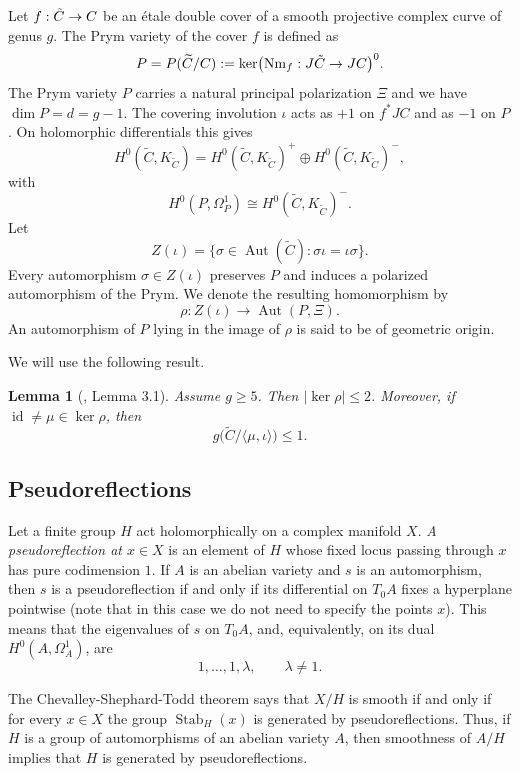 \documentclass{article}
\newtheorem{lem}[thm]{Lemma}
\numberwithin{equation}{section}
\newcommand{\tC}{\Tilde{C}}
\DeclareMathOperator{\Aut}{Aut}
\begin{document}
Let $f:\tC\to C$ be an \'{e}tale double cover of a smooth projective complex curve of genus $g$. The Prym variety of the cover $f$ is defined as $$P=P(\widetilde C/C):=\ker\bigl(\operatorname{Nm}_f: J\tC\to JC\bigr)^0.$$
The Prym variety \(P\) carries a natural principal polarization $\Xi$ and we have \(\dim P = d = g-1\). The covering involution $\iota$ acts as $+1$ on $f^*JC$ and as $-1$ on $P$. On holomorphic differentials this gives
$$H^0(\widetilde C,K_{\widetilde C})
=H^0(\widetilde C,K_{\widetilde C})^+
\oplus H^0(\widetilde C,K_{\widetilde C})^-,$$
with
$$ H^0(P,\Omega_P^1)\cong H^0(\widetilde C,K_{\widetilde C})^-.$$
Let $$Z(\iota)=\{\sigma\in\Aut(\widetilde C):\sigma\iota=\iota\sigma\}.$$
Every automorphism $\sigma\in Z(\iota)$ preserves $P$ and induces a polarized automorphism of the Prym. We denote the resulting homomorphism by
\[
\rho\colon Z(\iota)\longrightarrow \Aut(P,\Xi).
\]
An automorphism of $P$ lying in the image of $\rho$ is said to be of geometric origin.

We will use the following result.

\begin{lem}[\cite{ALN}, Lemma 3.1]\label{lem:kernel}
Assume $g\geq5$. Then $|\ker\rho|\leq2$. Moreover, if $\operatorname{id}\neq\mu\in\ker\rho$, then $$g\bigl(\widetilde C/\langle\mu,\iota\rangle\bigr)\leq1.$$
\end{lem}

\subsection{Pseudoreflections}

Let a finite group $H$ act holomorphically on a complex manifold $X$. \textit{A pseudoreflection at $x\in X$} is an element of $H$ whose fixed locus passing through $x$ has pure codimension $1$. If $A$ is an abelian variety and $s$ is an automorphism, then $s$ is a pseudoreflection if and only if its differential on $T_0A$ fixes a hyperplane pointwise (note that in this case we do not need to specify the points $x$). This means that the eigenvalues of $s$ on $T_0A$, and, equivalently, on its dual $H^0(A,\Omega_A^1)$, are
$$1,\ldots,1,\lambda, \qquad \lambda\neq1.$$

The Chevalley-Shephard-Todd theorem says that $X/H$ is smooth if and only if for every $x \in X$ the group $\operatorname{Stab}_H(x)$ is generated by pseudoreflections. Thus, if $H$ is a group of automorphisms of an abelian variety $A$, then smoothness of $A/H$ implies that $H$ is generated by pseudoreflections.
\end{document}
